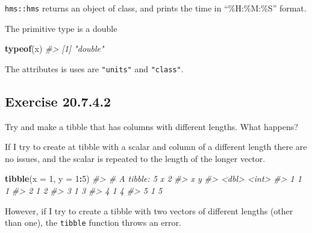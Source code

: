 \documentclass[]{book}
\newenvironment{Shaded}{\begin{snugshade}}{\end{snugshade}}
\newcommand{\CommentTok}[1]{\textcolor[rgb]{0.56,0.35,0.01}{\textit{#1}}}
\newcommand{\DataTypeTok}[1]{\textcolor[rgb]{0.13,0.29,0.53}{#1}}
\newcommand{\DecValTok}[1]{\textcolor[rgb]{0.00,0.00,0.81}{#1}}
\newcommand{\KeywordTok}[1]{\textcolor[rgb]{0.13,0.29,0.53}{\textbf{#1}}}
\newcommand{\NormalTok}[1]{#1}
\newcommand{\OperatorTok}[1]{\textcolor[rgb]{0.81,0.36,0.00}{\textbf{#1}}}
\theoremstyle{plain}
\theoremstyle{remark}
\begin{document}
\texttt{hms::hms} returns an object of class, and prints the time in
``\%H:\%M:\%S'' format.

The primitive type is a double

\begin{Shaded}
\begin{Highlighting}[]
\KeywordTok{typeof}\NormalTok{(x)}
\CommentTok{#> [1] "double"}
\end{Highlighting}
\end{Shaded}

The attributes is uses are \texttt{"units"} and \texttt{"class"}.

\begin{Shaded}
\end{Shaded}

\hypertarget{exercise-20.7.4.2}{%
\subsection*{\texorpdfstring{Exercise
{20.7.4.2}}{Exercise 20.7.4.2}}\label{exercise-20.7.4.2}}

Try and make a tibble that has columns with different lengths. What
happens?

If I try to create at tibble with a scalar and column of a different
length there are no issues, and the scalar is repeated to the length of
the longer vector.

\begin{Shaded}
\begin{Highlighting}[]
\KeywordTok{tibble}\NormalTok{(}\DataTypeTok{x =} \DecValTok{1}\NormalTok{, }\DataTypeTok{y =} \DecValTok{1}\OperatorTok{:}\DecValTok{5}\NormalTok{)}
\CommentTok{#> # A tibble: 5 x 2}
\CommentTok{#>       x     y}
\CommentTok{#>   <dbl> <int>}
\CommentTok{#> 1     1     1}
\CommentTok{#> 2     1     2}
\CommentTok{#> 3     1     3}
\CommentTok{#> 4     1     4}
\CommentTok{#> 5     1     5}
\end{Highlighting}
\end{Shaded}

However, if I try to create a tibble with two vectors of different
lengths (other than one), the \texttt{tibble} function throws an error.
\end{document}
